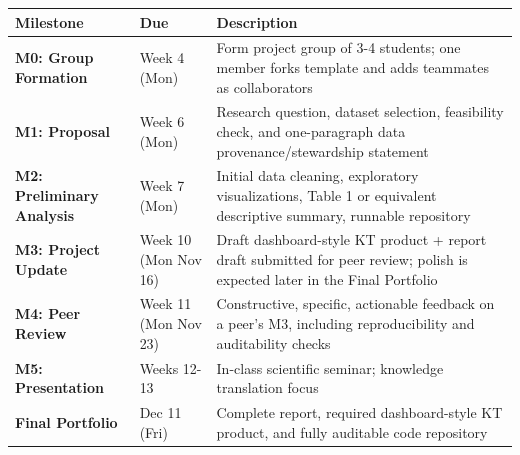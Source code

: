 \documentclass[
  letterpaper,
  DIV=11,
  numbers=noendperiod,
  oneside]{scrreprt}
\begin{document}
\begin{longtable}[]{@{}
  >{\raggedright\arraybackslash}p{}
  >{\raggedright\arraybackslash}p{}
  >{\raggedright\arraybackslash}p{}@{}}
\toprule\noalign{}
\begin{minipage}[b]{\linewidth}\raggedright
Milestone
\end{minipage} & \begin{minipage}[b]{\linewidth}\raggedright
Due
\end{minipage} & \begin{minipage}[b]{\linewidth}\raggedright
Description
\end{minipage} \\
\midrule\noalign{}
\endhead
\bottomrule\noalign{}
\endlastfoot
\textbf{M0: Group Formation} & Week 4 (Mon) & Form project group of 3-4
students; one member forks template and adds teammates as
collaborators \\
\textbf{M1: Proposal} & Week 6 (Mon) & Research question, dataset
selection, feasibility check, and one-paragraph data
provenance/stewardship statement \\
\textbf{M2: Preliminary Analysis} & Week 7 (Mon) & Initial data
cleaning, exploratory visualizations, Table 1 or equivalent descriptive
summary, runnable repository \\
\textbf{M3: Project Update} & Week 10 (Mon Nov 16) & Draft
dashboard-style KT product + report draft submitted for peer review;
polish is expected later in the Final Portfolio \\
\textbf{M4: Peer Review} & Week 11 (Mon Nov 23) & Constructive,
specific, actionable feedback on a peer's M3, including reproducibility
and auditability checks \\
\textbf{M5: Presentation} & Weeks 12-13 & In-class scientific seminar;
knowledge translation focus \\
\textbf{Final Portfolio} & Dec 11 (Fri) & Complete report, required
dashboard-style KT product, and fully auditable code repository \\
\end{longtable}
\end{document}

